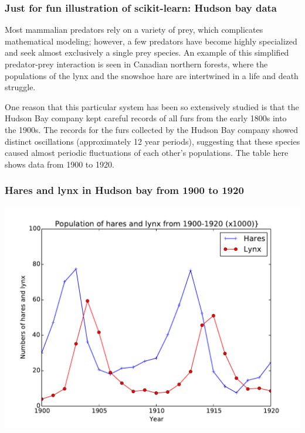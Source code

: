 \documentclass{beamer}
\begin{document}
\begin{frame}
\frametitle{Just for fun illustration of scikit-learn: Hudson bay data}

\begin{block}{}
Most mammalian predators rely on a variety of prey, which complicates mathematical modeling; however, a few predators have become highly specialized and seek almost exclusively a single prey species. An example of this simplified predator-prey interaction is seen in Canadian northern forests, where the populations of the lynx and the snowshoe hare are intertwined in a life and death struggle.

One reason that this particular system has been so extensively studied is that the Hudson Bay company kept careful records of all furs from the early 1800s into the 1900s. The records for the furs collected by the Hudson Bay company showed distinct oscillations (approximately 12 year periods), suggesting that these species caused almost periodic fluctuations of each other's populations. The table here shows data from 1900 to 1920.

\end{block}
\end{frame}

\begin{frame}
\frametitle{Hares and lynx in Hudson bay from 1900 to 1920}

\vspace{6mm}

\centerline{\includegraphics[width=0.9\linewidth]{figures/Hudson_Bay_data.pdf}}

\vspace{6mm}
\end{frame}
\end{document}
